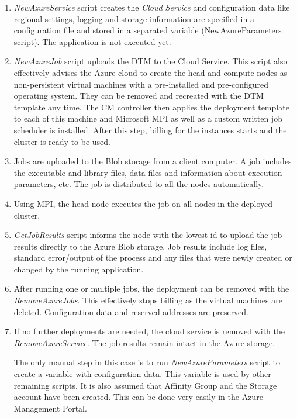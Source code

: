\documentclass[3p,times]{elsarticle}
\begin{document}
\begin{enumerate}

	\item \textit{NewAzureService} script creates the {\it Cloud Service} and configuration data like regional settings, logging and storage information are specified in a configuration file and stored in a separated variable (NewAzureParameters script). The application is not executed yet.

	\item \textit{NewAzureJob} script uploads the DTM to the Cloud Service. This script also effectively advises the Azure cloud to create the head and compute nodes as non-persistent virtual machines with a pre-installed and pre-configured operating system. They can be removed and recreated with the DTM template any time.  The CM controller then applies the deployment template to each of this machine and Microsoft MPI as well as a custom written job scheduler is installed. After this step, billing for the instances starts and the cluster is ready to be used.

	\item Jobs are uploaded to the Blob storage from a client computer. A job includes the executable and library files, data files and information about execution parameters, etc. The job is distributed to all the nodes automatically. 

	\item Using MPI, the head node executes the job on all nodes in the deployed cluster.

 	\item \textit{GetJobResults} script informs the node with the lowest id to upload the job results directly to the Azure Blob storage. Job results include log files, standard error/output of the process and any files that were newly created or changed by the running application.

	\item After running one or multiple jobs, the deployment can be removed with the \textit{RemoveAzureJobs}. This effectively stops billing as the virtual machines are deleted. Configuration data and reserved addresses are preserved.

	\item If no further deployments are needed, the cloud service is removed with the \textit{RemoveAzureService}. The job results remain intact in the Azure storage.

The only manual step in this case is to run \textit{NewAzureParameters} script to create a variable with configuration data. This variable is used by other remaining scripts. It is also assumed that Affinity Group and the Storage account have been created. This can be done very easily in the Azure Management Portal.

\end{enumerate}
\end{document}
